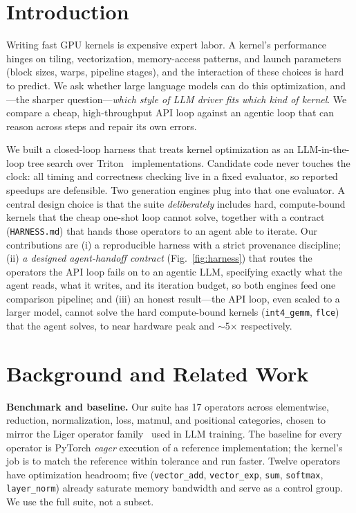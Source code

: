 \documentclass[conference]{IEEEtran}
\begin{document}
\section{Introduction}
Writing fast GPU kernels is expensive expert labor. A kernel's performance hinges
on tiling, vectorization, memory-access patterns, and launch parameters
(block sizes, warps, pipeline stages), and the interaction of these choices is
hard to predict. We ask whether large language models can do this optimization,
and---the sharper question---\emph{which style of LLM driver fits which kind of
kernel}. We compare a cheap, high-throughput API loop against an agentic loop
that can reason across steps and repair its own errors.

We built a closed-loop harness that treats kernel optimization as an
LLM-in-the-loop tree search over Triton~\cite{tillet2019triton} implementations.
Candidate code never touches the clock: all timing and correctness checking live
in a fixed evaluator, so reported speedups are defensible. Two generation engines
plug into that one evaluator. A central design choice is that the suite
\emph{deliberately} includes hard, compute-bound kernels that the cheap one-shot
loop cannot solve, together with a contract (\texttt{HARNESS.md}) that hands those
operators to an agent able to iterate. Our contributions are (i) a reproducible
harness with a strict provenance discipline; (ii) \emph{a designed agent-handoff
contract} (Fig.~\ref{fig:harness}) that routes the operators the API loop fails on
to an agentic LLM, specifying exactly what the agent reads, what it writes, and
its iteration budget, so both engines feed one comparison pipeline; and (iii) an
honest result---the API loop, even scaled to a larger model, cannot solve the hard
compute-bound kernels (\texttt{int4\_gemm}, \texttt{flce}) that the agent solves,
to near hardware peak and $\sim$5$\times$ respectively.

\section{Background and Related Work}
\textbf{Benchmark and baseline.} Our suite has 17 operators across elementwise,
reduction, normalization, loss, matmul, and positional categories, chosen to
mirror the Liger operator family~\cite{hsu2024liger} used in LLM training. The
baseline for every operator is PyTorch \emph{eager} execution of a reference
implementation; the kernel's job is to match the reference within tolerance and
run faster. Twelve operators have optimization headroom; five
(\texttt{vector\_add}, \texttt{vector\_exp}, \texttt{sum}, \texttt{softmax},
\texttt{layer\_norm}) already saturate memory bandwidth and serve as a control
group. We use the full suite, not a subset.
\end{document}
